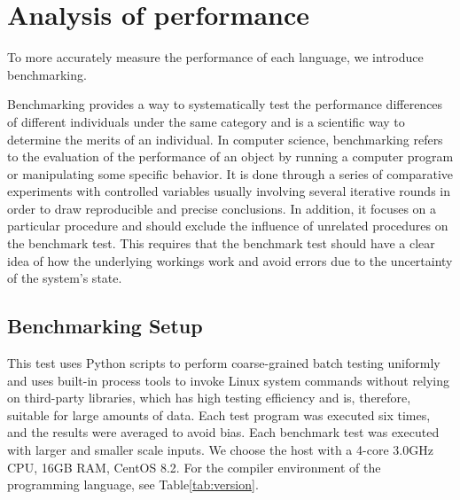 \section{Analysis of performance}

To more accurately measure the performance of each language, we introduce benchmarking.

Benchmarking provides a way to systematically test the
performance differences of different individuals under the same
category and is a scientific way to determine the merits of
an individual\cite{hockney1996science}.
In computer science, benchmarking refers to the evaluation of
the performance of an object by running a computer program or
manipulating some specific behavior.
It is done through a series of comparative experiments with
controlled variables usually involving several iterative rounds
in order to draw reproducible and precise conclusions\cite{fleming1986not}.
In addition, it focuses on a particular procedure and
should exclude the influence of unrelated procedures on
the benchmark test.
This requires that the benchmark test should have a
clear idea of how the underlying workings work and avoid errors
due to the uncertainty of the system's state.

\subsection{Benchmarking Setup}


This test uses Python scripts to perform coarse-grained
batch testing uniformly and uses built-in process tools
to invoke Linux system commands without relying on
third-party libraries, which has high testing efficiency
and is, therefore, suitable for large amounts of data.
Each test program was executed six times, and the results
were averaged to avoid bias.
Each benchmark test was
executed with larger and smaller scale inputs.
We choose the host with a 4-core 3.0GHz CPU, 16GB RAM, CentOS 8.2.
For the compiler environment of the programming
language, see Table\ref{tab:version}.

